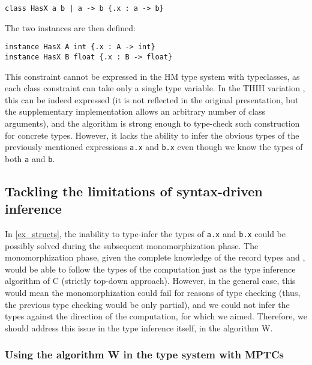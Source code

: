 \begin{center}
    \lstinline/class HasX a b | a -> b {.x : a -> b}/
\end{center}

The two instances are then defined:

\begin{lstlisting}
instance HasX A int {.x : A -> int}
instance HasX B float {.x : B -> float}
\end{lstlisting}

This constraint cannot be expressed in the HM type system with typeclasses, as each class constraint can take only a single type variable. In the THIH variation \cite{jones1999typing}, this can be indeed expressed (it is not reflected in the original presentation, but the supplementary implementation allows an arbitrary number of class arguments), and the algorithm is strong enough to type-check such construction for concrete types. However, it lacks the ability to infer the obvious types of the previously mentioned expressions \lstinline{a.x} and \lstinline{b.x} even though we know the types of both \lstinline{a} and \lstinline{b}.

\subsection{Tackling the limitations of syntax-driven inference}
\label{sec:tackle}

In \cref{ex_structs}, the inability to type-infer the types of \lstinline{a.x} and \lstinline{b.x} could be possibly solved during the subsequent monomorphization phase. The monomorphization phase, given the complete knowledge of the record types  and , would be able to follow the types of the computation just as the type inference algorithm of C (strictly top-down approach). However, in the general case, this would mean the monomorphization could fail for reasons of type checking (thus, the previous type checking would be only partial), and we could not infer the types against the direction of the computation, for which we aimed. Therefore, we should address this issue in the type inference itself, in the algorithm W.

\subsubsection{Using the algorithm W in the type system with MPTCs}

